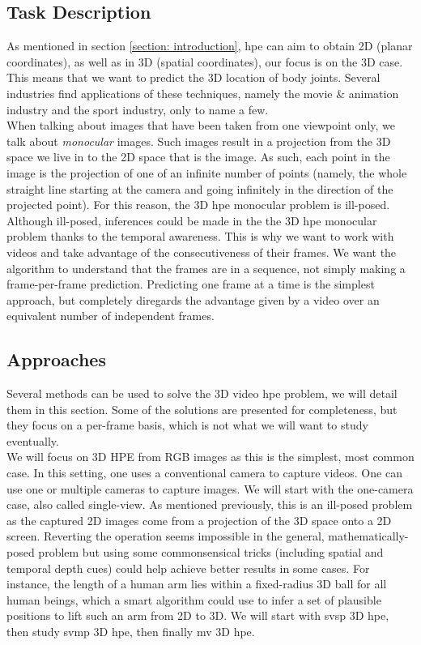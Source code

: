 \documentclass[runningheads]{llncs}
\begin{document}
\subsection{Task Description}
As mentioned in section \ref{section: introduction}, \ac{hpe} can aim to obtain 2D (planar coordinates), as well as in 3D (spatial coordinates), our focus is on the 3D case. This means that we want to predict the 3D location of body joints. Several industries find applications of these techniques, namely the movie \& animation industry and the sport industry, only to name a few. \\
When talking about images that have been taken from one viewpoint only, we talk about \textit{monocular} images. Such images result in a projection from the 3D space we live in to the 2D space that is the image. As such, each point in the image is the projection of one of an infinite number of points (namely, the whole straight line starting at the camera and going infinitely in the direction of the projected point). For this reason, the 3D \ac{hpe} monocular problem is ill-posed. \\
Although ill-posed, inferences could be made in the the 3D \ac{hpe} monocular problem thanks to the temporal awareness. This is why we want to work with videos and take advantage of the consecutiveness of their frames. We want the algorithm to understand that the frames are in a sequence, not simply making a frame-per-frame prediction. Predicting one frame at a time is the simplest approach, but completely diregards the advantage given by a video over an equivalent number of independent frames.

\subsection{Approaches}
Several methods can be used to solve the 3D video \ac{hpe} problem, we will detail them in this section. Some of the solutions are presented for completeness, but they focus on a per-frame basis, which is not what we will want to study eventually. \\
We will focus on 3D HPE from RGB images as this is the simplest, most common case. In this setting, one uses a conventional camera to capture videos. One can use one or multiple cameras to capture images. We will start with the one-camera case, also called single-view. As mentioned previously, this is an ill-posed problem as the captured 2D images come from a projection of the 3D space onto a 2D screen. Reverting the operation seems impossible in the general, mathematically-posed problem but using some commonsensical tricks (including spatial and temporal depth cues) could help achieve better results in some cases. For instance, the length of a human arm lies within a fixed-radius 3D ball for all human beings, which a smart algorithm could use to infer a set of plausible positions to lift such an arm from 2D to 3D. We will start with \ac{svsp} 3D \ac{hpe}, then study \ac{svmp} 3D \ac{hpe}, then finally \ac{mv} 3D \ac{hpe}.
\end{document}
